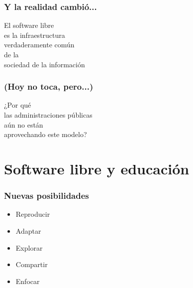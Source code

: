 \documentclass[17pt,aspectratio=169]{beamer}
\begin{document}

\begin{frame}
\frametitle{Y la realidad cambió...}

{\Large
\begin{center}
  El software libre \\
  es la infraestructura \\
  verdaderamente común \\
  de la \\
  sociedad de la información \\
\end{center}
}
\end{frame}


\begin{frame}
\frametitle{(Hoy no toca, pero...)}

\begin{center}
{\Large
  ¿Por qué \\
  las administraciones públicas \\
  aún no están \\
  aprovechando este modelo? \\
}
\end{center}

\end{frame}

\section{Software libre y educación}


\begin{frame}
\frametitle{Nuevas posibilidades}

\begin{itemize}
  \item Reproducir
\item Adaptar
\item Explorar
\item Compartir
\item Enfocar
\end{itemize}

\end{frame}
\end{document}
